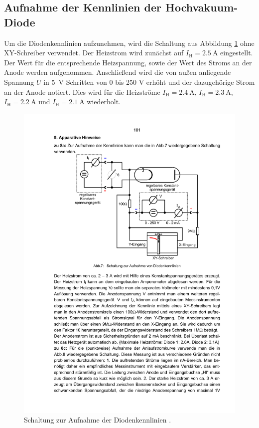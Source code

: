 \subsection{Aufnahme der Kennlinien der Hochvakuum-Diode}

Um die Diodenkennlinien aufzunehmen, wird die Schaltung aus Abbildung \ref{fig:aufbau1} ohne XY-Schreiber verwendet. Der Heizstrom wird zunächst auf   $I_\mathrm{H} = \SI{2.5}{\ampere}$ eingestellt. Der Wert für die entsprechende Heizspannung, sowie der Wert des Stroms an der Anode werden aufgenommen. Anschließend wird die von außen anliegende Spannung $U$ in \SI{5}{\volt} Schritten von 0 bis 250 \si{\volt} erhöht und der dazugehörige Strom an der Anode notiert. Dies wird für die Heizströme $I_\mathrm{H} = \SI{2.4}{\ampere}$, $I_\mathrm{H} = \SI{2.3}{\ampere}$, $I_\mathrm{H} = \SI{2.2}{\ampere}$ und $I_\mathrm{H} = \SI{2.1}{\ampere}$ wiederholt.

\begin{figure}
  \centering
  \includegraphics[scale=0.6]{content/aufbau1.pdf}
\caption{Schaltung zur Aufnahme der Diodenkennlinien \cite{anleitung504}.}
  \label{fig:aufbau1}
\end{figure}

